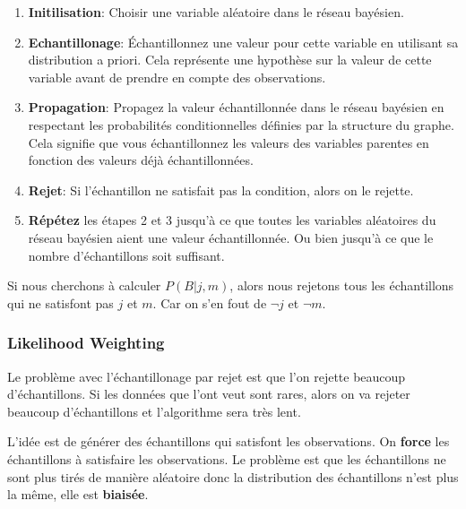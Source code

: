 \begin{enumerate}
    \item \textbf{Initilisation}: Choisir une variable aléatoire dans le réseau bayésien.
    \item \textbf{Echantillonage}: Échantillonnez une valeur pour cette variable en utilisant sa distribution a priori. 
        Cela représente une hypothèse sur la valeur de cette variable avant de prendre en compte des observations.
    \item \textbf{Propagation}: Propagez la valeur échantillonnée dans le réseau bayésien en 
        respectant les probabilités conditionnelles définies par la structure du graphe. 
        Cela signifie que vous échantillonnez les valeurs des variables parentes en fonction des valeurs déjà échantillonnées.
    \item \textbf{Rejet}: Si l'échantillon ne satisfait pas la condition, alors on le rejette.
    \item \textbf{Répétez} les étapes 2 et 3 jusqu'à ce que toutes les variables aléatoires du réseau bayésien aient une valeur échantillonnée. Ou bien jusqu'à ce que le nombre d'échantillons soit suffisant.
\end{enumerate}

\begin{example}\leavevmode
    Si nous cherchons à calculer $P(B | j, m)$, alors nous rejetons tous les échantillons qui ne satisfont pas $j$ et $m$. Car 
    on s'en fout de $\neg j$ et $\neg m$.
\end{example}

\subsubsection{Likelihood Weighting} %
\label{sec:likelihood_weighting} 

Le problème avec l'échantillonage par rejet est que l'on rejette beaucoup d'échantillons. Si 
les données que l'ont veut sont rares, alors on va rejeter beaucoup d'échantillons et l'algorithme sera très lent.

L'idée est de générer des échantillons qui satisfont les observations. On \textbf{force} les échantillons à satisfaire les observations.
Le problème est que les échantillons ne sont plus tirés de manière aléatoire donc la distribution des échantillons n'est plus la même, elle est \textbf{biaisée}.

